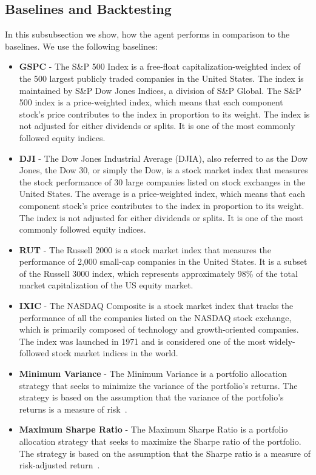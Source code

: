 \documentclass[../xlapes02]{subfiles}
\begin{document}
    \subsection{Baselines and Backtesting}\label{subsec:baselines-and-backtesting}
    In this subsubsection we show, how the agent performs in comparison to the baselines. We use the following baselines:
    \begin{itemize}
        \item \textbf{GSPC} - The S\&P 500 Index is a free-float capitalization-weighted index of the 500 largest publicly traded companies in the United States. The index is maintained by S\&P Dow Jones Indices, a division of S\&P Global. The S\&P 500 index is a price-weighted index, which means that each component stock's price contributes to the index in proportion to its weight. The index is not adjusted for either dividends or splits. It is one of the most commonly followed equity indices.
        \item \textbf{DJI} - The Dow Jones Industrial Average (DJIA), also referred to as the Dow Jones, the Dow 30, or simply the Dow, is a stock market index that measures the stock performance of 30 large companies listed on stock exchanges in the United States. The average is a price-weighted index, which means that each component stock's price contributes to the index in proportion to its weight. The index is not adjusted for either dividends or splits. It is one of the most commonly followed equity indices.
        \item \textbf{RUT} - The Russell 2000 is a stock market index that measures the performance of 2,000 small-cap companies in the United States. It is a subset of the Russell 3000 index, which represents approximately 98\% of the total market capitalization of the US equity market.
        \item \textbf{IXIC} - The NASDAQ Composite is a stock market index that tracks the performance of all the companies listed on the NASDAQ stock exchange, which is primarily composed of technology and growth-oriented companies. The index was launched in 1971 and is considered one of the most widely-followed stock market indices in the world.
        \item \textbf{Minimum Variance} - The Minimum Variance is a portfolio allocation strategy that seeks to minimize the variance of the portfolio's returns. The strategy is based on the assumption that the variance of the portfolio's returns is a measure of risk~\cite{investopedia-portfolio-variance}.
        \item \textbf{Maximum Sharpe Ratio} - The Maximum Sharpe Ratio is a portfolio allocation strategy that seeks to maximize the Sharpe ratio of the portfolio. The strategy is based on the assumption that the Sharpe ratio is a measure of risk-adjusted return~\cite{investopedia-sharpe-ratio}.
    \end{itemize}
\end{document}
